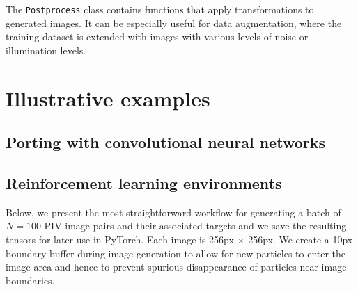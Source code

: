 \documentclass[a4paper,fleqn]{cas-dc}
\newcommand{ \kamila}[1]{\color{blue}{Kamila: #1} \color{black}}
\begin{document}
The \texttt{Postprocess} class contains functions that apply transformations to generated images. It can be especially useful for data augmentation, where the training dataset is extended with images with various levels of noise or illumination levels.

\section{Illustrative examples} \label{sec:examples}

\subsection{Porting with convolutional neural networks}

\kamila{Here we can describe what can be achieved in terms of training a CNN.}

\subsection{Reinforcement learning environments}

\kamila{Here we can describe what can be achieved in terms of training an RL agent, e.g. in the context of autonomous experimentation. Maybe the agent will learn to augment the dataset in real time to account for changing experimental settings.}





Below, we present the most straightforward workflow for generating a batch of $N=100$ PIV image pairs and their associated targets and we save the resulting tensors for later use in PyTorch. Each image is 256px $\times$ 256px. We create a 10px boundary buffer during image generation to allow for new particles to enter the image area and hence to prevent spurious disappearance of particles near image boundaries.
\end{document}
